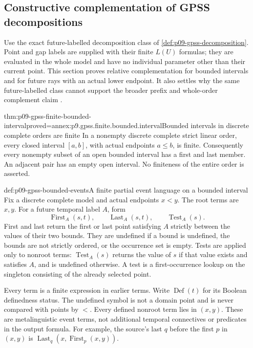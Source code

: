 
\subsection{Constructive complementation of GPSS decompositions}
\label{sec:p09-gpss-decomposition-complement}

Use the exact future-labelled decomposition class of
\cref{def:p09-gpss-decomposition}. Point and gap labels are supplied
with their finite \(L(U)\) formulas; they are evaluated in the
whole model and have no individual parameter other than their
current point. This section proves relative complementation for
bounded intervals and for future rays with an actual lower endpoint.
It also settles why the same future-labelled class cannot support
the broader prefix and whole-order complement claim
\cite[Proposition~2.4 and its outline, p.~171]{GabbayPnueliShelahStavi1980}.

\begin{hblemma}{thm:p09-gpss-finite-bounded-interval}{proved=annex:p9.gpss.finite.bounded.interval}{Bounded intervals in discrete complete orders are finite}
In a nonempty discrete complete strict linear order, every closed
interval \([a,b]\), with actual endpoints \(a\leq b\),
is finite. Consequently every nonempty subset of an open bounded
interval has a first and last member. An adjacent pair has an empty
open interval. No finiteness of the entire order is asserted.
\end{hblemma}

\begin{hbdefinition}{def:p09-gpss-bounded-events}{A finite partial event language on a bounded interval}
Fix a discrete complete model and actual endpoints \(x<y\).
The root terms are \(x,y\).
For a future temporal label \(A\), form
\[
 \operatorname{First}_A(s,t),\qquad
 \operatorname{Last}_A(s,t),\qquad
 \operatorname{Test}_A(s).
\]
First and last return the first or last point satisfying \(A\)
strictly between the values of their two bounds. They are undefined
if a bound is undefined, the bounds are not strictly ordered, or the
occurrence set is empty. Tests are applied only to nonroot terms:
\(\operatorname{Test}_A(s)\) returns the value of \(s\) if
that value exists and satisfies \(A\), and is undefined otherwise.
A test is a first-occurrence lookup on the singleton consisting of
the already selected point.

Every term is a finite expression in earlier terms. Write
\(\operatorname{Def}(t)\) for its Boolean definedness status.
The undefined symbol is not a domain point and is never compared
with points by \(<\). Every defined nonroot term lies in
\((x,y)\). These are metalinguistic event terms, not additional
temporal connectives or predicates in the output formula. For example,
the source's last \(q\) before the first \(p\) in \((x,y)\)
is \(\operatorname{Last}_q(x,\operatorname{First}_p(x,y))\).
\end{hbdefinition}

